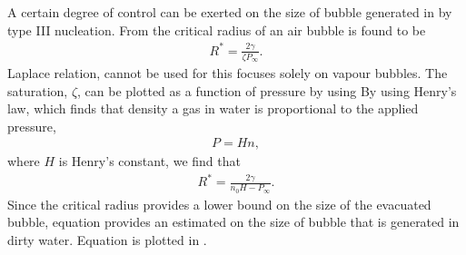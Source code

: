 A certain degree of control can be exerted on the size of bubble generated in by type III nucleation.
From  the critical radius of an air bubble is found to be
\begin{align}
  R^\ast = \frac{2 \gamma}{\zeta P_\infty}.
\end{align}
Laplace relation,  cannot be used for this focuses solely on vapour bubbles.
The saturation, $\zeta$, can be plotted as a function of pressure by using 
By using Henry's law,
which finds that density a gas in water is proportional to the applied pressure,
\begin{align}
  P = H n,
\end{align}
where $H$ is Henry's constant, we find that 
\begin{align}
  R^\ast = \frac{2\gamma}{n_0H - P_\infty}.
\end{align}
Since the critical radius provides a lower bound on the size of the evacuated bubble,
equation  provides an estimated on the size of bubble that is generated in dirty water.
Equation  is plotted in .







%

